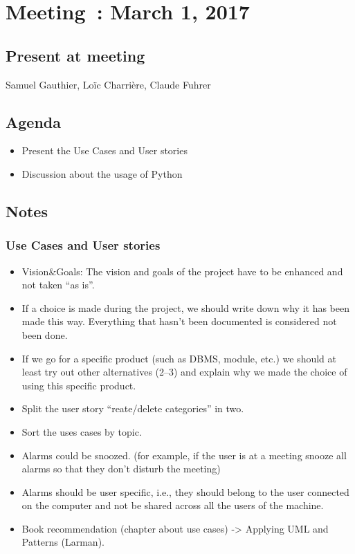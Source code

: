 \section{Meeting~: March 1, 2017}
\subsection*{Present at meeting}
Samuel Gauthier, Loïc Charrière, Claude Fuhrer
\subsection*{Agenda}
\begin{itemize}
	\item Present  the Use Cases  and User stories
	\item Discussion about the usage of Python
\end{itemize}
\subsection*{Notes}
	\subsubsection{Use Cases and User stories}
	\begin{itemize}
        	\item Vision\&Goals: The vision and goals of the project have to be enhanced and not taken ``as is''.
		\item If a choice is made during the project, we should write down why it has been made this way. Everything that hasn't been documented is considered not been done.
		\item If we go for a specific product (such as DBMS, module, etc.) we should at least try out other alternatives (2--3) and explain why we made the choice of using this specific product.
		\item Split the user story ``reate/delete categories'' in two.
		\item Sort the uses cases by topic.
		\item Alarms could be snoozed. (for example, if the user is at a meeting snooze all alarms so that they don't disturb the meeting) 
		\item Alarms should be user specific, i.e., they should belong to the user connected on the computer and not be shared across all the users of the machine.
		\item Book recommendation (chapter about use cases) -> Applying UML and Patterns (Larman).
	\end{itemize}
